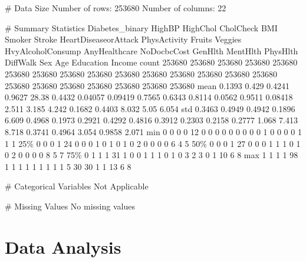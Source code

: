 \documentclass[11pt]{article}
\begin{document}
\begin{codeoutput}
\# Data Size
Number of rows: 253680
Number of columns: 22

\# Summary Statistics
      Diabetes\_binary HighBP HighChol CholCheck    BMI Smoker  Stroke HeartDiseaseorAttack PhysActivity Fruits Veggies HvyAlcoholConsump AnyHealthcare NoDocbcCost GenHlth MentHlth PhysHlth DiffWalk    Sex    Age Education Income
count          253680 253680   253680    253680 253680 253680  253680               253680       253680 253680  253680            253680        253680      253680  253680   253680   253680   253680 253680 253680    253680 253680
mean           0.1393  0.429   0.4241    0.9627  28.38 0.4432 0.04057              0.09419       0.7565 0.6343  0.8114            0.0562        0.9511     0.08418   2.511    3.185    4.242   0.1682 0.4403  8.032      5.05  6.054
std            0.3463 0.4949   0.4942    0.1896  6.609 0.4968  0.1973               0.2921       0.4292 0.4816  0.3912            0.2303        0.2158      0.2777   1.068    7.413    8.718   0.3741 0.4964  3.054    0.9858  2.071
min                 0      0        0         0     12      0       0                    0            0      0       0                 0             0           0       1        0        0        0      0      1         1      1
25\%                 0      0        0         1     24      0       0                    0            1      0       1                 0             1           0       2        0        0        0      0      6         4      5
50\%                 0      0        0         1     27      0       0                    0            1      1       1                 0             1           0       2        0        0        0      0      8         5      7
75\%                 0      1        1         1     31      1       0                    0            1      1       1                 0             1           0       3        2        3        0      1     10         6      8
max                 1      1        1         1     98      1       1                    1            1      1       1                 1             1           1       5       30       30        1      1     13         6      8

\# Categorical Variables
Not Applicable

\# Missing Values
No missing values
\end{codeoutput}

\section{Data Analysis}
\end{document}
